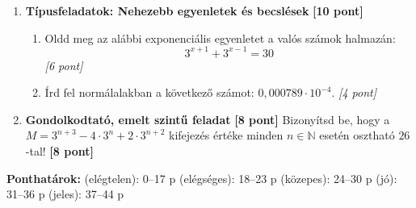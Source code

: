 \documentclass[11pt,a4paper]{article}
\begin{document}
\begin{enumerate}
    \vspace{2mm}
    \item \textbf{Típusfeladatok: Nehezebb egyenletek és becslések} \hfill \textbf{[10 pont]}
    \begin{enumerate}
        \item Oldd meg az alábbi exponenciális egyenletet a valós számok halmazán:
        $$3^{x+1} + 3^{x-1} = 30$$ \hfill \textit{[6 pont]}
        \item Írd fel normálalakban a következő számot: $0{,}000789 \cdot 10^{-4}$. \hfill \textit{[4 pont]}
    \end{enumerate}

    \vspace{2mm}
    \item \textbf{Gondolkodtató, emelt szintű feladat} \hfill \textbf{[8 pont]}
    Bizonyítsd be, hogy a $M = 3^{n+3} - 4 \cdot 3^n + 2 \cdot 3^{n+2}$ kifejezés értéke minden $n \in \mathbb{N}$ esetén osztható $26$-tal! \hfill \textbf{[8 pont]}
\end{enumerate}

\vfill
\noindent
\begin{center}
\small
\textbf{Ponthatárok:}  (elégtelen): 0--17 p  (elégséges): 18--23 p  (közepes): 24--30 p  (jó): 31--36 p  (jeles): 37--44 p
\end{center}
\end{document}
